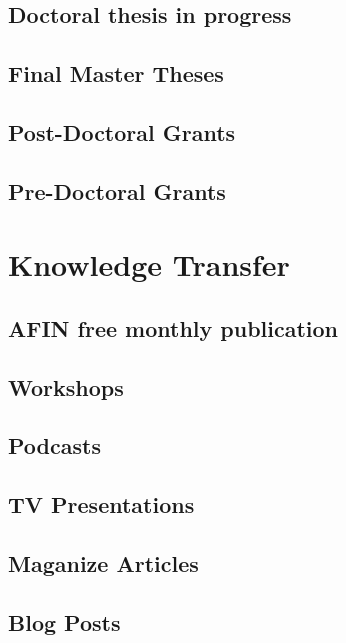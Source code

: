 \documentclass[english,a4paper,12pt,titlepage]{report}
\begin{document}
  \section{Doctoral thesis in progress}
  	
  \section{Final Master Theses}
  	
  \section{Post-Doctoral Grants}
  	
  \section{Pre-Doctoral Grants}
  	

  \chapter{Knowledge Transfer}

  \section{AFIN free monthly publication}
  	
  \section{Workshops}
  	
  \section{Podcasts}
  	
  \section{TV Presentations}
  	
   \section{Maganize Articles}
   	
   \section{Blog Posts} 
   	
\end{document}
